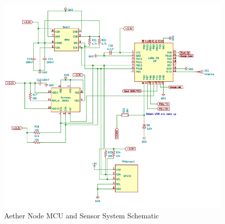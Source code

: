 \begin{figure}
    \centering
    \includegraphics[scale=.75]{figures/MCU_Schematic.jpg}
    \caption{Aether Node MCU and Sensor System Schematic}
    \label{fig:MCU_Sensor} 
\end{figure}
